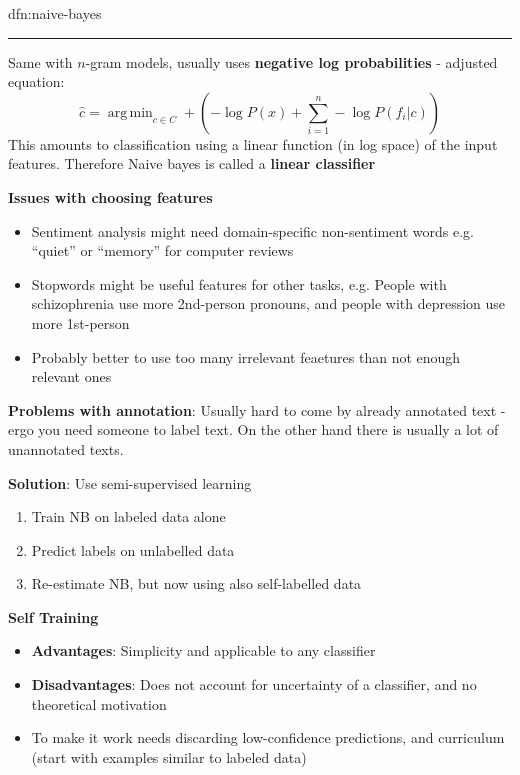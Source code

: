 \documentclass[landscape, 8pt]{extarticle}
\DeclareMathOperator*{\argmin}{arg\,min}
\begin{document}
\begin{multicols}{3}
\begin{dfn}{dfn:naive-bayes}{}
\begin{itemize}[leftmargin=*]
    \end{itemize}

    \vspace{-10pt}
    \noindent\rule{\textwidth}{0.2pt}
    Same with $n$-gram models, usually uses \textbf{negative log probabilities} - adjusted equation:
    \[\hat{c} = \argmin_{c\in C} + (-\log P(x) + \sum_{i = 1}^{n} -\log P(f_{i} | c))\]
    This amounts to classification using a linear function (in log space) of the input features. Therefore Naive bayes is called a \textbf{linear classifier}
\end{dfn}

\columnbreak

\textbf{Issues with choosing features}
\begin{itemize}
    \setlength\itemsep{0em}
    \item Sentiment analysis might need domain-specific non-sentiment words e.g. ``quiet'' or ``memory'' for computer reviews
    \item Stopwords might be useful features for other tasks, e.g. People with schizophrenia use more 2nd-person pronouns, and people with depression use more 1st-person
    \item Probably better to use too many irrelevant feaetures than not enough relevant ones
\end{itemize}

\textbf{Problems with annotation}: Usually hard to come by already annotated text - ergo you need someone to label text. On the other hand there is usually a lot of unannotated texts.

\textbf{Solution}: Use semi-supervised learning
\begin{enumerate}
    \setlength\itemsep{0em}
    \item Train NB on labeled data alone
    \item Predict labels on unlabelled data
    \item Re-estimate NB, but now using also self-labelled data
\end{enumerate}

\textbf{Self Training}
\begin{itemize}
    \setlength\itemsep{0em}
    \item \textbf{Advantages}: Simplicity and applicable to any classifier
    \item \textbf{Disadvantages}: Does not account for uncertainty of a classifier, and no theoretical motivation
    \item To make it work needs discarding low-confidence predictions, and curriculum (start with examples similar to labeled data)
\end{itemize}


\end{multicols}
\end{document}
